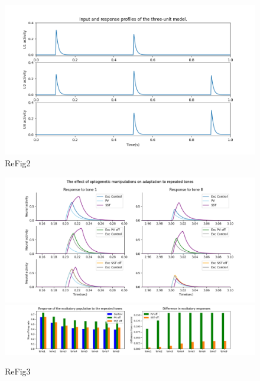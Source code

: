 \begin{figure}
 \includegraphics[width=\textwidth]{Figures/Fig2}
 \caption{ReFig2}
\end{figure}

\begin{figure}
 
 \includegraphics[width=\textwidth]{Figures/Fig3B}
 \includegraphics[width=\textwidth]{Figures/Fig3C}
 \caption{ReFig3}
\end{figure}

